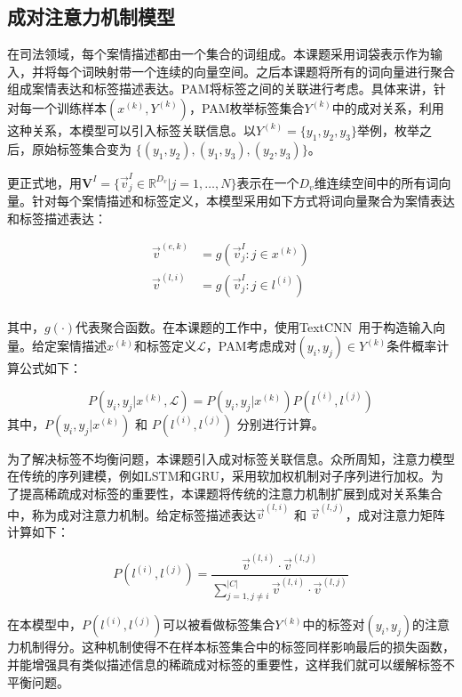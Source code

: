 \subsection{成对注意力机制模型}
在司法领域，每个案情描述都由一个集合的词组成。本课题采用词袋表示作为输入，并将每个词映射带一个连续的向量空间。之后本课题将所有的词向量进行聚合组成案情表达和标签描述表达。PAM将标签之间的关联进行考虑。具体来讲，针对每一个训练样本$(x^{(k)}, Y^{(k)})$，PAM枚举标签集合$Y^{(k)}$中的成对关系，利用这种关系，本模型可以引入标签关联信息。以$Y^{(k)}=\{y_1,y_2,y_3\}$举例，枚举之后，原始标签集合变为 $\{(y_1,y_2),(y_1,y_3),(y_2,y_3)\}$。

更正式地，用$\textbf{V}^I=\{\vec{v}^I_j\in \mathbb{R}^{D_v}|j=1,\dots,N\}$表示在一个$D_v$维连续空间中的所有词向量。针对每个案情描述和标签定义，本模型采用如下方式将词向量聚合为案情表达和标签描述表达：

\begin{equation}
    \begin{aligned}
        \vec{v}^{(e,k)}&=g(\vec{v}^I_j:j\in x^{(k)})\\
        \vec{v}^{(l,i)}&=g(\vec{v}^I_j:j\in l^{(i)})\\
    \end{aligned}
\end{equation}

其中，$g(\cdot)$代表聚合函数。在本课题的工作中，使用TextCNN~\cite{Kim14}用于构造输入向量。给定案情描述$x^{(k)}$和标签定义$\mathcal{L}$，PAM考虑成对$(y_i,y_j)\in Y^{(k)}$条件概率计算公式如下：

\begin{equation}
    P(y_i,y_j|x^{(k)},\mathcal{L})=P(y_i,y_j|x^{(k)})P(l^{(i)},l^{(j)})
\end{equation}
其中，$P(y_i,y_j|x^{(k)})$ 和 $P(l^{(i)},l^{(j)})$ 分别进行计算。

为了解决标签不均衡问题，本课题引入成对标签关联信息。众所周知，注意力模型在传统的序列建模，例如LSTM和GRU，采用软加权机制对子序列进行加权。为了提高稀疏成对标签的重要性，本课题将传统的注意力机制扩展到成对关系集合中，称为成对注意力机制。给定标签描述表达$\vec{v}^{(l,i)}$ 和 $\vec{v}^{(l,j)}$，成对注意力矩阵计算如下：

\begin{equation}\label{eq:similiar}
P(l^{(i)},l^{(j)})=\frac{\vec{v}^{(l,i)}\cdot\vec{v}^{(l,j)}}{\sum_{j=1,j\neq i}^{|C|}\vec{v}^{(l,i)}\cdot\vec{v}^{(l,j)}}
\end{equation}

在本模型中，$P(l^{(i)}, l^{(j)})$可以被看做标签集合$Y^{(k)}$中的标签对$(y_i, y_j)$的注意力机制得分。这种机制使得不在样本标签集合中的标签同样影响最后的损失函数，并能增强具有类似描述信息的稀疏成对标签的重要性，这样我们就可以缓解标签不平衡问题。

